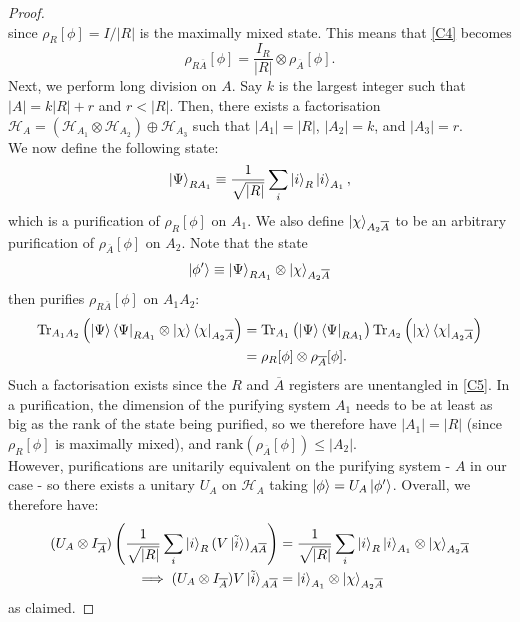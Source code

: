 \documentclass[12pt,a4paper]{report}
\numberwithin{equation}{section}
\newcommand{\ketbra}[2]{\ket{#1}\bra{#2}}
\newcommand{\ketbras}[1]{\ketbra{#1}{#1}}
\newcommand{\ol}[1]{\overline{#1}}
\theoremstyle{definition}
\theoremstyle{theorem}
\theoremstyle{theorem}
\theoremstyle{example}
\theoremstyle{definition}
\begin{document}
\begin{proof}
\begin{equation}
	\end{equation}
	since $\rho_{R}[\phi]=I/|R|$ is the maximally mixed state. This means that \ref{C4} becomes
	\begin{equation}\label{C5}
		\rho_{R\overline{A}}[\phi]=\frac{I_{R}}{|R|}\otimes\rho_{\overline{A}}[\phi].
	\end{equation}
	Next, we perform long division on $A$. Say $k$ is the largest integer such that $|A|=k|R|+r$ and $r<|R|$. Then, there exists a factorisation $\mathcal{H}_{A}=\left(\mathcal{H}_{A_{1}}\otimes\mathcal{H}_{A_{2}}\right)\oplus\mathcal{H}_{A_{3}}$ such that $|A_{1}|=|R|$, $|A_{2}|=k$, and $|A_{3}|=r$.\\
	We now define the following state:
	\begin{equation}
		\ket{\Psi}_{RA_{1}}\equiv\frac{1}{\sqrt{|R|}}\sum_{i}\ket{i}_{R}\ket{i}_{A_{1}},
	\end{equation}
	which is a purification of $\rho_{R}[\phi]$ on $A_{1}$. We also define $\ket{\chi}_{A_{2}\ol{A}}$ to be an arbitrary purification of $\rho_{\ol{A}}[\phi]$ on $A_{2}$. Note that the state
	\begin{equation}
		\ket{\phi'}\equiv\ket{\Psi}_{RA_{1}}\otimes\ket{\chi}_{A_{2}\overline{A}}
	\end{equation}
	then purifies $\rho_{R\overline{A}}[\phi]$ on $A_{1}A_{2}$:
	\begin{equation}
		\begin{aligned}
			\text{Tr}_{A_{1}A_{2}}\left(\ketbras{\Psi}_{RA_{1}}\otimes\ketbras{\chi}_{A_{2}\overline{A}}\right)&=\text{Tr}_{A_{1}}\left(\ketbras{\Psi}_{RA_{1}}\right)\text{Tr}_{A_{2}}\left(\ketbras{\chi}_{A_{2}\overline{A}}\right)\\&=\rho_{R}[\phi]\otimes\rho_{\overline{A}}[\phi].
		\end{aligned}
	\end{equation}
	Such a factorisation exists since the $R$ and $\ol{A}$ registers are unentangled in \ref{C5}. In a purification, the dimension of the purifying system $A_{1}$ needs to be at least as big as the rank of the state being purified, so we therefore have $|A_{1}|=|R|$ (since $\rho_{R}[\phi]$ is maximally mixed), and $\text{rank}\left(\rho_{\overline{A}}[\phi]\right)\leq|A_{2}|$.\\
	However, purifications are unitarily equivalent on the purifying system - $A$ in our case - so there exists a unitary $U_{A}$ on $\mathcal{H}_{A}$ taking $\ket{\phi}=U_{A}\ket{\phi'}$. Overall, we therefore have:
	\begin{equation}
		\begin{aligned}
			(U_{A}\otimes I_{\ol{A}})\left(\frac{1}{\sqrt{|R|}}\sum_{i}\ket{i}_{R}(V\ket{\tilde{i}})_{A\overline{A}}\right)&=\frac{1}{\sqrt{|R|}}\sum_{i}\ket{i}_{R}\ket{i}_{A_{1}}\otimes\ket{\chi}_{A_{2}\overline{A}}\\
			\implies (U_{A}\otimes I_{\ol{A}})V\ket{\tilde{i}}_{A\overline{A}}&=\ket{i}_{A_{1}}\otimes\ket{\chi}_{A_{2}\overline{A}}
		\end{aligned}
	\end{equation}
	as claimed.
\end{proof}
\end{document}
